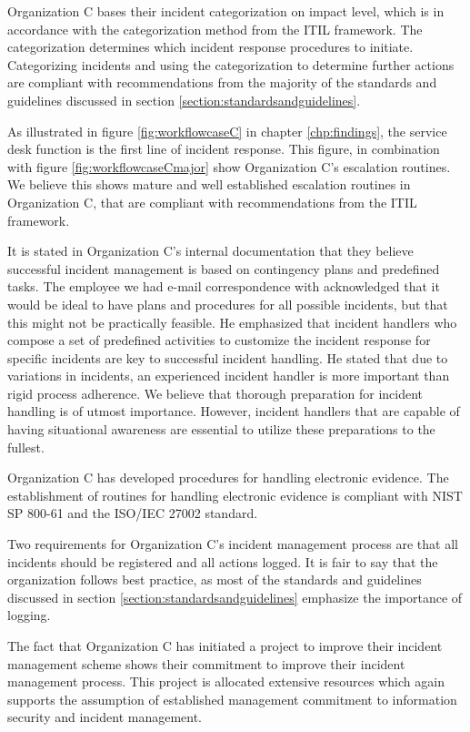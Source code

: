 Organization C bases their incident categorization on impact level, which is in accordance with the categorization method from the ITIL framework. The categorization determines which incident response procedures to initiate. Categorizing incidents and using the categorization to determine further actions are compliant with recommendations from the majority of the standards and guidelines discussed in section \ref{section:standardsandguidelines}.

As illustrated in figure \ref{fig:workflowcaseC} in chapter \ref{chp:findings}, the service desk function is the first line of incident response. This figure, in combination with figure \ref{fig:workflowcaseCmajor} show Organization C's escalation routines. We believe this shows mature and well established escalation routines in Organization C, that are compliant with recommendations from the ITIL framework.

It is stated in Organization C's internal documentation that they believe successful incident management is based on contingency plans and predefined tasks. The employee we had e-mail correspondence with acknowledged that it would be ideal to have plans and procedures for all possible incidents, but that this might not be practically feasible. He emphasized that incident handlers who compose a set of predefined activities to customize the incident response for specific incidents are key to successful incident handling. He stated that due to variations in incidents, an experienced incident handler is more important than rigid process adherence. We believe that thorough preparation for incident handling is of utmost importance. However, incident handlers that are capable of having situational awareness are essential to utilize these preparations to the fullest. 

Organization C has developed procedures for handling electronic evidence. The establishment of routines for handling electronic evidence is compliant with NIST SP 800-61 and the ISO/IEC 27002 standard.

Two requirements for Organization C's incident management process are that all incidents should be registered and all actions logged. It is fair to say that the organization follows best practice, as most of the standards and guidelines discussed in section \ref{section:standardsandguidelines} emphasize the importance of logging.

The fact that Organization C has initiated a project to improve their incident management scheme shows their commitment to improve their incident management process. This project is allocated extensive resources which again supports the assumption of established management commitment to information security and incident management.

